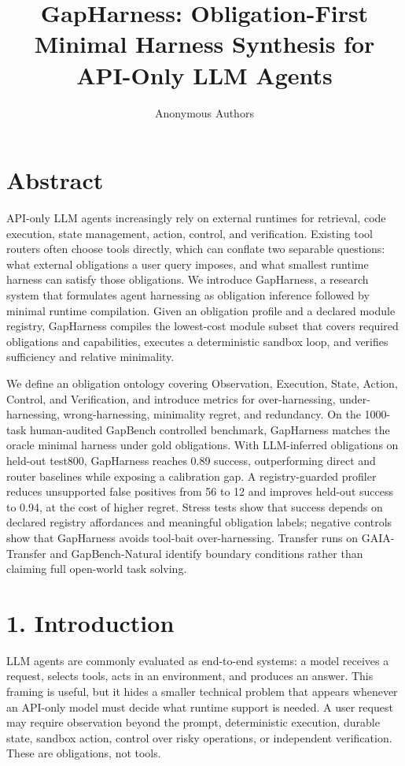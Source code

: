 \documentclass[
  10pt,
]{article}
\title{GapHarness: Obligation-First Minimal Harness Synthesis for
API-Only LLM Agents}
\author{Anonymous Authors}
\date{}
\begin{document}
\maketitle

\section{Abstract}\label{abstract}

API-only LLM agents increasingly rely on external runtimes for
retrieval, code execution, state management, action, control, and
verification. Existing tool routers often choose tools directly, which
can conflate two separable questions: what external obligations a user
query imposes, and what smallest runtime harness can satisfy those
obligations. We introduce GapHarness, a research system that formulates
agent harnessing as obligation inference followed by minimal runtime
compilation. Given an obligation profile and a declared module registry,
GapHarness compiles the lowest-cost module subset that covers required
obligations and capabilities, executes a deterministic sandbox loop, and
verifies sufficiency and relative minimality.

We define an obligation ontology covering Observation, Execution, State,
Action, Control, and Verification, and introduce metrics for
over-harnessing, under-harnessing, wrong-harnessing, minimality regret,
and redundancy. On the 1000-task human-audited GapBench controlled
benchmark, GapHarness matches the oracle minimal harness under gold
obligations. With LLM-inferred obligations on held-out test800,
GapHarness reaches 0.89 success, outperforming direct and router
baselines while exposing a calibration gap. A registry-guarded profiler
reduces unsupported false positives from 56 to 12 and improves held-out
success to 0.94, at the cost of higher regret. Stress tests show that
success depends on declared registry affordances and meaningful
obligation labels; negative controls show that GapHarness avoids
tool-bait over-harnessing. Transfer runs on GAIA-Transfer and
GapBench-Natural identify boundary conditions rather than claiming full
open-world task solving.

\section{1. Introduction}\label{introduction}

LLM agents are commonly evaluated as end-to-end systems: a model
receives a request, selects tools, acts in an environment, and produces
an answer. This framing is useful, but it hides a smaller technical
problem that appears whenever an API-only model must decide what runtime
support is needed. A user request may require observation beyond the
prompt, deterministic execution, durable state, sandbox action, control
over risky operations, or independent verification. These are
obligations, not tools.
\end{document}
